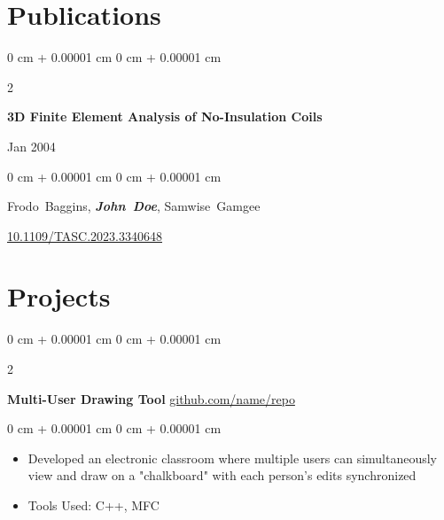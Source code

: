 \documentclass[10pt, letterpaper]{article}
\newenvironment{highlights}{
    \begin{itemize}[
        topsep=0.10 cm,
        parsep=0.10 cm,
        partopsep=0pt,
        itemsep=0pt,
        leftmargin=0 cm + 10pt
    ]
}{
    \end{itemize}
} %
\newenvironment{onecolentry}{
    \begin{adjustwidth}{
        0 cm + 0.00001 cm
    }{
        0 cm + 0.00001 cm
    }
}{
    \end{adjustwidth}
} %
\newenvironment{twocolentry}[2][]{
    \onecolentry
    \def\secondColumn{#2}
    \setcolumnwidth{\fill, 4.5 cm}
    \begin{paracol}{2}
}{
    \switchcolumn \raggedleft \secondColumn
    \end{paracol}
    \endonecolentry
} %
\begin{document}
    
    \section{Publications}



        
        \begin{samepage}
            \begin{twocolentry}{
                Jan 2004
            }
                \textbf{3D Finite Element Analysis of No-Insulation Coils}
            \end{twocolentry}

            \vspace{0.10 cm}
            
            \begin{onecolentry}
                \mbox{Frodo Baggins}, \mbox{\textbf{\textit{John Doe}}}, \mbox{Samwise Gamgee}

                \vspace{0.10 cm}
                
        \href{https://doi.org/10.1109/TASC.2023.3340648}{10.1109/TASC.2023.3340648}
        \end{onecolentry}
        \end{samepage}


    
    \section{Projects}



        
        \begin{twocolentry}{
            \href{https://github.com/sinaatalay/rendercv}{github.com/name/repo}
        }
            \textbf{Multi-User Drawing Tool}\end{twocolentry}

        \vspace{0.10 cm}
        \begin{onecolentry}
            \begin{highlights}
                \item Developed an electronic classroom where multiple users can simultaneously view and draw on a "chalkboard" with each person's edits synchronized
                \item Tools Used: C++, MFC
            \end{highlights}
        \end{onecolentry}
\end{document}

